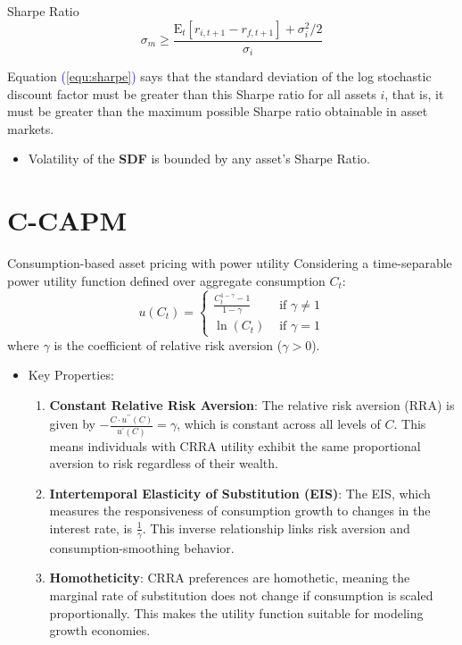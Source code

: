 \documentclass{beamer}
\begin{document}
\begin{frame}{Sharpe Ratio}
    \begin{equation}
    \sigma_m \geqslant \frac{\mathrm{E}_t\left[r_{i, t+1}-r_{f, t+1}\right]+\sigma_i^2 / 2}{\sigma_i}
    \label{equ:sharpe}
    \end{equation}
    
Equation \textcolor{blue}{(\ref{equ:sharpe})} says that the standard deviation of the log stochastic discount factor must be greater than this Sharpe ratio for all assets $i$, that is, it must be greater than the maximum possible Sharpe ratio obtainable in asset markets.
\begin{itemize}
    \item Volatility of the \textbf{SDF} is bounded by any asset's Sharpe Ratio.
\end{itemize}

\end{frame}

\section{C-CAPM}

\begin{frame}{Consumption-based asset pricing with power utility}
	Considering a time-separable power utility function defined over aggregate consumption $ C_t $:
	\begin{equation}
        u(C_t)= \begin{cases}\frac{C_t^{1-\gamma}-1}{1-\gamma} & \text { if } \gamma \neq 1 \\ \ln (C_t) & \text { if } \gamma=1\end{cases}
        \end{equation}
where $ \gamma $ is the coefficient of relative risk aversion ($ \gamma > 0 $).

\begin{itemize}
    \item Key Properties:
        \begin{enumerate}
            \item \textbf{Constant Relative Risk Aversion}: The relative risk aversion (RRA) is given by $-\frac{C \cdot u^{\prime \prime}(C)}{u^{\prime}(C)}= \gamma$, which is constant across all levels of $C$. This means individuals with CRRA utility exhibit the same proportional aversion to risk regardless of their wealth.
            \item \textbf{Intertemporal Elasticity of Substitution (EIS)}: The EIS, which measures the responsiveness of consumption growth to changes in the interest rate, is $\frac{1}{\gamma}$. This inverse relationship links risk aversion and consumption-smoothing behavior.
            \item \textbf{Homotheticity}: CRRA preferences are homothetic, meaning the marginal rate of substitution does not change if consumption is scaled proportionally. This makes the utility function suitable for modeling growth economies.
        \end{enumerate}
\end{itemize}
\end{frame}
\end{document}
